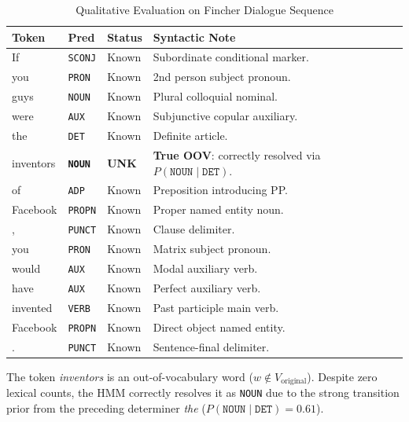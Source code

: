 \documentclass[conference]{IEEEtran}
\begin{document}
\begin{table}[htbp]
\caption{Qualitative Evaluation on Fincher Dialogue Sequence}
\label{tab:fincher_demo}
\centering
\begin{tabular}{lllp{3.2cm}}
\toprule
\textbf{Token} & \textbf{Pred} & \textbf{Status} & \textbf{Syntactic Note} \\
\midrule
If        & \texttt{SCONJ} & Known & Subordinate conditional marker. \\
you       & \texttt{PRON}  & Known & 2nd person subject pronoun. \\
guys      & \texttt{NOUN}  & Known & Plural colloquial nominal. \\
were      & \texttt{AUX}   & Known & Subjunctive copular auxiliary. \\
the       & \texttt{DET}   & Known & Definite article. \\
inventors & \textbf{\texttt{NOUN}} & \textbf{UNK} & \textbf{True OOV}: correctly resolved via $P(\texttt{NOUN} \mid \texttt{DET})$. \\
of        & \texttt{ADP}   & Known & Preposition introducing PP. \\
Facebook  & \texttt{PROPN} & Known & Proper named entity noun. \\
,         & \texttt{PUNCT} & Known & Clause delimiter. \\
you       & \texttt{PRON}  & Known & Matrix subject pronoun. \\
would     & \texttt{AUX}   & Known & Modal auxiliary verb. \\
have      & \texttt{AUX}   & Known & Perfect auxiliary verb. \\
invented  & \texttt{VERB}  & Known & Past participle main verb. \\
Facebook  & \texttt{PROPN} & Known & Direct object named entity. \\
.         & \texttt{PUNCT} & Known & Sentence-final delimiter. \\
\bottomrule
\end{tabular}
\end{table}

The token \textit{inventors} is an out-of-vocabulary word ($w \notin V_{\text{original}}$). Despite zero lexical counts, the HMM correctly resolves it as \texttt{NOUN} due to the strong transition prior from the preceding determiner \textit{the} ($P(\texttt{NOUN} \mid \texttt{DET}) = 0.61$).
\end{document}
